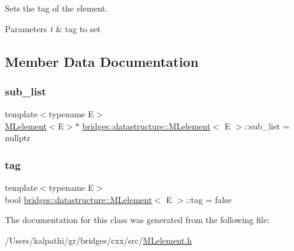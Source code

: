 Sets the tag of the element. 


\begin{DoxyParams}{Parameters}
{\em t} & tag to set \\
\hline
\end{DoxyParams}


\subsection{Member Data Documentation}
\mbox{\label{classbridges_1_1datastructure_1_1_m_lelement_afe31ff363c0861efb8eacc12f2a651df}} 
\subsubsection{\texorpdfstring{sub\_list}{sub\_list}}
{\footnotesize\ttfamily template$<$typename E$>$ \\
\mbox{\hyperlink{classbridges_1_1datastructure_1_1_m_lelement}{M\+Lelement}}$<$E$>$$\ast$ \mbox{\hyperlink{classbridges_1_1datastructure_1_1_m_lelement}{bridges\+::datastructure\+::\+M\+Lelement}}$<$ E $>$\+::sub\+\_\+list = nullptr\hspace{0.3cm}{\ttfamily [protected]}}

\mbox{\label{classbridges_1_1datastructure_1_1_m_lelement_aef061a364a85ebb0c0f2cdaff8c726e6}} 
\subsubsection{\texorpdfstring{tag}{tag}}
{\footnotesize\ttfamily template$<$typename E$>$ \\
bool \mbox{\hyperlink{classbridges_1_1datastructure_1_1_m_lelement}{bridges\+::datastructure\+::\+M\+Lelement}}$<$ E $>$\+::tag = false\hspace{0.3cm}{\ttfamily [protected]}}



The documentation for this class was generated from the following file\+:\begin{DoxyCompactItemize}
\item 
/\+Users/kalpathi/gr/bridges/cxx/src/\mbox{\hyperlink{_m_lelement_8h}{M\+Lelement.\+h}}\end{DoxyCompactItemize}
